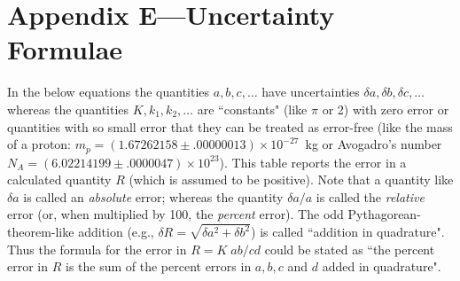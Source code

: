 \documentclass[11pt,twoside]{report}
\begin{document}
\section*{Appendix E---Uncertainty Formulae}
In the below equations the quantities
$a,b,c,\ldots$ have uncertainties $\delta a,\delta b,\delta c,\ldots$ 
whereas the quantities
$K, k_1,k_2,\ldots$ are ``constants" (like $\pi$ or 2) with
zero error or quantities with so small error that they can be treated
as error-free (like the mass of a proton: $m_p=(1.67262158\pm.00000013)\times 10^{-27}$~kg
or Avogadro's number $N_A = (6.022 141 99\pm .0000047)\times 10^{23}$).
This table reports the error in a calculated quantity $R$ (which is assumed to be positive).  
Note that a quantity like
$\delta a$ is called an {\em absolute} error; whereas the quantity
$\delta a/a$ is called the {\em relative} error (or, when multiplied by
100, the {\em percent} error).  The odd Pythagorean-theorem-like addition
(e.g., $\delta R= \sqrt{\delta a^2 + \delta b^2}$) is called ``addition in
quadrature".  Thus the formula for the error in $R=K\;{ab/cd}$ could be stated as
``the percent error in $R$ is the sum of the percent errors in $a,b,c$ and $d$ added
in quadrature".
\end{document}

